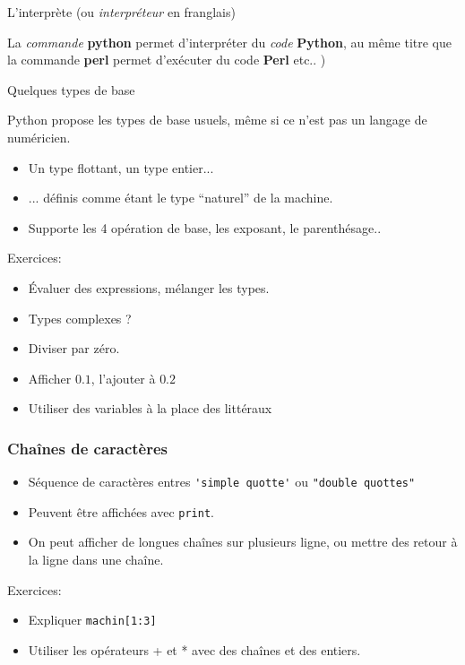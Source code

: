 \documentclass{beamer}
\begin{document}
\begin{frame}{L'interprète}
(ou {\em interpréteur} en franglais)

La {\em commande} {\bf python} permet d'interpréter du {\em code} {\bf Python}, au même titre que la commande {\bf perl} permet d'exécuter du code {\bf Perl} etc.. 
)


\end{frame}

\begin{frame}{Quelques types de base}

  Python propose les types de base usuels, même si ce n'est pas un langage de numéricien.
  \begin{itemize}
  \item Un type flottant, un type entier...
  \item ... définis comme étant le type ``naturel'' de la machine.
  \item Supporte les 4 opération de base, les exposant, le parenthésage..
  \end{itemize}
  Exercices:
  \begin{itemize}
  \item Évaluer des expressions, mélanger les types.
  \item Types complexes ?
  \item Diviser par zéro.
  \item Afficher $0.1$, l'ajouter à $0.2$
  \item Utiliser des variables à la place des littéraux
  \end{itemize}
\end{frame}

\begin{frame}[fragile]\frametitle{Chaînes de caractères}
  \begin{itemize}
  \item Séquence de caractères entres {\verb|'simple quotte'|} ou {\verb|"double quottes"|}
  \item Peuvent être affichées avec {\verb|print|}.
  \item On peut afficher de longues chaînes sur plusieurs ligne, ou mettre des retour à la ligne dans une chaîne.
  \end{itemize}
  Exercices:
  \begin{itemize}
  \item Expliquer \verb|machin[1:3]|
  \item Utiliser les opérateurs + et * avec des chaînes et des entiers.
  \end{itemize}
\end{frame}
\end{document}
